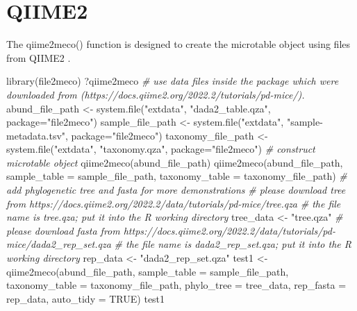 \documentclass[
]{book}
\newenvironment{Shaded}{\begin{snugshade}}{\end{snugshade}}
\newcommand{\AttributeTok}[1]{\textcolor[rgb]{0.77,0.63,0.00}{#1}}
\newcommand{\CommentTok}[1]{\textcolor[rgb]{0.56,0.35,0.01}{\textit{#1}}}
\newcommand{\ConstantTok}[1]{\textcolor[rgb]{0.00,0.00,0.00}{#1}}
\newcommand{\FunctionTok}[1]{\textcolor[rgb]{0.00,0.00,0.00}{#1}}
\newcommand{\NormalTok}[1]{#1}
\newcommand{\OtherTok}[1]{\textcolor[rgb]{0.56,0.35,0.01}{#1}}
\newcommand{\StringTok}[1]{\textcolor[rgb]{0.31,0.60,0.02}{#1}}
\begin{document}
\hypertarget{qiime2}{%
\section{QIIME2}\label{qiime2}}

The qiime2meco() function is designed to create the microtable object using files from QIIME2 \citep{Bolyen_Reproducible_2019}.

\begin{Shaded}
\begin{Highlighting}[]
\FunctionTok{library}\NormalTok{(file2meco)}
\NormalTok{?qiime2meco}
\CommentTok{\# use data files inside the package which were downloaded from (https://docs.qiime2.org/2022.2/tutorials/pd{-}mice/).}
\NormalTok{abund\_file\_path }\OtherTok{\textless{}{-}} \FunctionTok{system.file}\NormalTok{(}\StringTok{"extdata"}\NormalTok{, }\StringTok{"dada2\_table.qza"}\NormalTok{, }\AttributeTok{package=}\StringTok{"file2meco"}\NormalTok{)}
\NormalTok{sample\_file\_path }\OtherTok{\textless{}{-}} \FunctionTok{system.file}\NormalTok{(}\StringTok{"extdata"}\NormalTok{, }\StringTok{"sample{-}metadata.tsv"}\NormalTok{, }\AttributeTok{package=}\StringTok{"file2meco"}\NormalTok{)}
\NormalTok{taxonomy\_file\_path }\OtherTok{\textless{}{-}} \FunctionTok{system.file}\NormalTok{(}\StringTok{"extdata"}\NormalTok{, }\StringTok{"taxonomy.qza"}\NormalTok{, }\AttributeTok{package=}\StringTok{"file2meco"}\NormalTok{)}
\CommentTok{\# construct microtable object}
\FunctionTok{qiime2meco}\NormalTok{(abund\_file\_path)}
\FunctionTok{qiime2meco}\NormalTok{(abund\_file\_path, }\AttributeTok{sample\_table =}\NormalTok{ sample\_file\_path, }\AttributeTok{taxonomy\_table =}\NormalTok{ taxonomy\_file\_path)}
\CommentTok{\# add phylogenetic tree and fasta for more demonstrations}
\CommentTok{\# please download tree from https://docs.qiime2.org/2022.2/data/tutorials/pd{-}mice/tree.qza}
\CommentTok{\# the file name is \textquotesingle{}tree.qza\textquotesingle{}; put it into the R working directory}
\NormalTok{tree\_data }\OtherTok{\textless{}{-}} \StringTok{"tree.qza"}
\CommentTok{\# please download fasta from https://docs.qiime2.org/2022.2/data/tutorials/pd{-}mice/dada2\_rep\_set.qza}
\CommentTok{\# the file name is \textquotesingle{}dada2\_rep\_set.qza\textquotesingle{}; put it into the R working directory}
\NormalTok{rep\_data }\OtherTok{\textless{}{-}} \StringTok{"dada2\_rep\_set.qza"}
\NormalTok{test1 }\OtherTok{\textless{}{-}} \FunctionTok{qiime2meco}\NormalTok{(abund\_file\_path, }\AttributeTok{sample\_table =}\NormalTok{ sample\_file\_path, }\AttributeTok{taxonomy\_table =}\NormalTok{ taxonomy\_file\_path, }\AttributeTok{phylo\_tree =}\NormalTok{ tree\_data, }\AttributeTok{rep\_fasta =}\NormalTok{ rep\_data, }\AttributeTok{auto\_tidy =} \ConstantTok{TRUE}\NormalTok{)}
\NormalTok{test1}
\end{Highlighting}
\end{Shaded}
\end{document}
